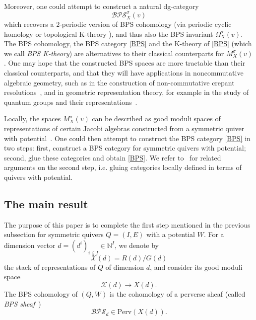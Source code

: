 \documentclass [11pt,oneside,a4paper,mathscr]{amsart}
\theoremstyle{definition}
\newcommand{\X}{\mathscr{X}}
\begin{document}
Moreover, one could attempt to construct a natural dg-category 
\begin{equation}\label{BPS}
\mathscr{BPS}^\sigma_X(v)
\end{equation}
which recovers a $2$-periodic version of BPS cohomology (via periodic cyclic homology or topological K-theory \cite{Blanc}), and thus also the BPS invariant $\Omega^\sigma_X(v)$. 
The BPS cohomology, the BPS category \eqref{BPS} and the K-theory of \eqref{BPS} (which we call \textit{BPS K-theory}) are alternatives to their classical counterparts for $M^\sigma_X(v)$.
One may hope that the constructed BPS spaces are more tractable than their classical counterparts, and that they will have applications in noncommutative algebraic geometry, 
such as in the construction of non-commutative crepant resolutions~\cite{PTquiver, PTK3}, and in geometric representation theory, for example in the study of quantum groups and their representations~\cite{MR3618057, VarVas, RSYZ2, BuRap}.

Locally, the spaces $M^\sigma_X(v)$ can be described as good moduli spaces of representations of certain Jacobi algebras constructed from a symmetric quiver with potential~\cite{JS, MR3811778}. 
One could then attempt to construct the BPS category \eqref{BPS} in two steps: first, construct a BPS category for symmetric quivers with potential; second, glue these categories and obtain \eqref{BPS}.
We refer to~\cite{halpK32, T, P2} for related arguments 
on the second step, i.e. gluing categories locally 
defined in terms of quivers with potential. 

\subsection{The main result}
The purpose of this paper is to complete the first step
mentioned in the previous subsection 
for symmetric quivers $Q=(I,E)$ with a potential $W$. 
For a dimension vector 
$d=(d^i)_{i\in I}\in\mathbb{N}^I$,
we denote by \[\X(d)=R(d)/G(d)\] the stack of 
representations of $Q$ of dimension $d$, 
and consider its good moduli space
\begin{equation}\label{map:gms}
\X(d) \to X(d).
\end{equation}
The BPS cohomology of $(Q,W)$ is the cohomology of a perverse sheaf (called \textit{BPS sheaf}~\cite{DM}) 
\[\mathcal{BPS}_d\in \mathrm{Perv}(X(d)).\]
\end{document}
